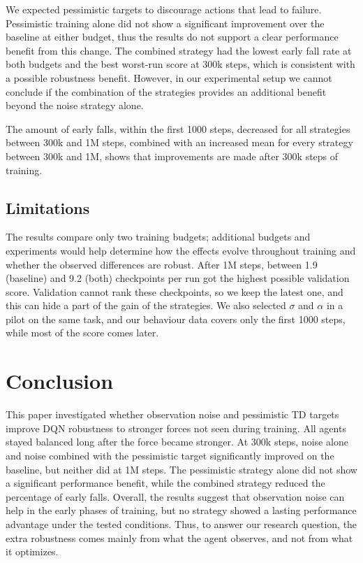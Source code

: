 \documentclass[sigconf]{acmart}
\begin{document}
We expected pessimistic targets to discourage actions that lead to failure. Pessimistic training alone did not show a significant improvement over the baseline at either budget, thus the results do not support a clear performance benefit from this change. The combined strategy had the lowest early fall rate at both budgets and the best worst-run score at 300k steps, which is consistent with a possible robustness benefit. However, in our experimental setup we cannot conclude if the combination of the strategies provides an additional benefit beyond the noise strategy alone.

The amount of early falls, within the first 1000 steps, decreased for all strategies between 300k and 1M steps, combined with an increased mean for every strategy between 300k and 1M, shows that improvements are made after 300k steps of training.

\subsection{Limitations}
The results compare only two training budgets; additional budgets and experiments would help determine how the effects evolve throughout training and whether the observed differences are robust. After 1M steps, between 1.9 (baseline) and 9.2 (both) checkpoints per run got the highest possible validation score. Validation cannot rank these checkpoints, so we keep the latest one, and this can hide a part of the gain of the strategies. We also selected $\sigma$ and $\alpha$ in a pilot on the same task, and our behaviour data covers only the first 1000 steps, while most of the score comes later.

\section{Conclusion}

This paper investigated whether observation noise and pessimistic TD targets improve DQN robustness to stronger forces not seen during training. All agents stayed balanced long after the force became stronger. At 300k steps, noise alone and noise combined with the pessimistic target significantly improved on the baseline, but neither did at 1M steps. The pessimistic strategy alone did not show a significant performance benefit, while the combined strategy reduced the percentage of early falls. Overall, the results suggest that observation noise can help in the early phases of training, but no strategy showed a lasting performance advantage under the tested conditions. Thus, to answer our research question, the extra robustness comes mainly from what the agent observes, and not from what it optimizes.
\end{document}
